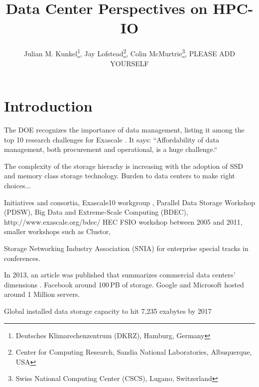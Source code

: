 \documentclass{superfri}
\numberwithin{equation}{section}
\begin{document}

\author{Julian M. Kunkel\footnote{\label{dkrz}Deutsches Klimarechenzentrum (DKRZ), Hamburg, Germany}, 
Jay Lofstead\footnote{Center for Computing Research, Sandia National Laboratories, Albuquerque, USA}, 
Colin McMurtrie\footnote{Swiss National Computing Center (CSCS), Lugano, Switzerland}, 
PLEASE ADD YOURSELF
} %

\title{Data Center Perspectives on HPC-IO}
\maketitle{}

\begin{abstract}

\noindent
{}
\end{abstract}

\section{Introduction}
\label{sec:intro}

\cite{DOEExa13}

The DOE recognizes the importance of data management, listing it among the top 10 research challenges for Exascale \cite{top14}.
It says: “Affordability of data management, both procurement and operational, is a huge challenge.“

The complexity of the storage hierachy is increasing with the adoption of SSD and memory class storage technology.
Burden to data centers to make right choices...

Initiatives and consortia, 
Exascale10 workgroup \cite{brinkmann14},
Parallel Data Storage Workshop (PDSW), 
Big Data and Extreme-Scale Computing (BDEC), http://www.exascale.org/bdec/
HEC FSIO workshop \cite{bancroft2009} between 2005 and 2011, 
smaller workshops such as Clustor, 

Storage Networking Industry Association (SNIA) for enterprise
special tracks in conferences.

In 2013, an article was published that summarizes commercial data centers' dimensions \cite{data13}.
Facebook around 100\,PB of storage. Google and Microsoft hosted around 1 Million servers.

Global installed data storage capacity to hit 7,235 exabytes by 2017
\cite{http://dailyindependentnig.com/2013/10/global-installed-data-storage-capacity-to-hit-7235-exabytes-by-2017-report/}
\end{document}
